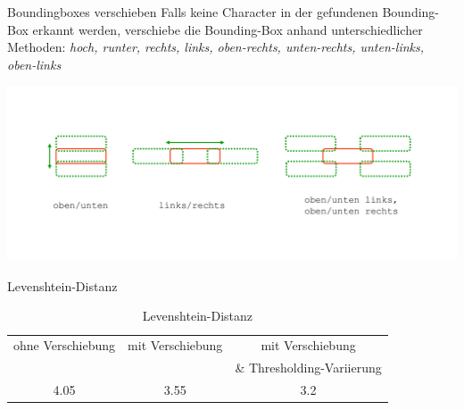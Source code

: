 \begin{frame}{Boundingboxes verschieben}
    Falls keine Character in der gefundenen Bounding-Box erkannt werden, verschiebe die Bounding-Box anhand unterschiedlicher Methoden: {\textit{hoch, runter, rechts, links, oben-rechts, unten-rechts, unten-links, oben-links}}
    \begin{center}
        \includegraphics[width=\textwidth]{img/bbox_shift}
    \end{center}
\end{frame}

\begin{frame}{Levenshtein-Distanz}
    \begin{table}[H]
        \centering
        \caption{Levenshtein-Distanz}
        \begin{tabular}{ccc}
            ohne Verschiebung & mit Verschiebung & mit Verschiebung           \\
                              &                  & \& Thresholding-Variierung \\
            4.05              & 3.55             & 3.2
        \end{tabular}
    \end{table}
\end{frame}

